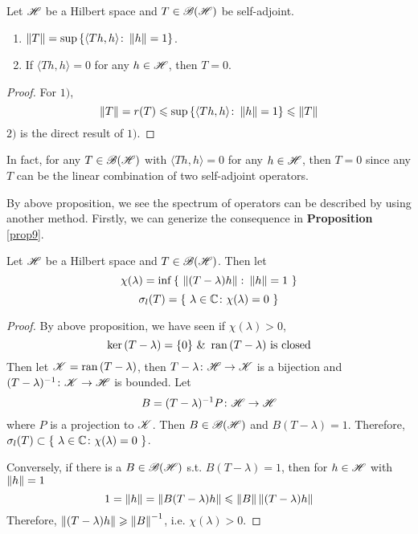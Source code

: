 \documentclass[a4paper,11pt]{report}
\begin{document}
\begin{cor} \label{cor8}
	Let $\mathscr{H}$ be a Hilbert space and $T \in \mathscr{B(H)}$ be self-adjoint.
	\begin{enumerate}[label=\arabic*)]
		\item $\left\lVert T\right\lVert = \sup{\{\langle Th,h \rangle \colon \left\lVert h\right\lVert = 1\}}$.
		\item If $\langle Th,h \rangle = 0$ for any $h \in \mathscr{H}$, then $T=0$.
	\end{enumerate}
\end{cor}
\begin{proof}
	For $1)$, 
	\begin{equation*}
		\left\lVert T\right\lVert = r(T) \leqslant \sup{\{\langle Th,h \rangle \colon \left\lVert h\right\lVert = 1\}} \leqslant \left\lVert T\right\lVert
	\end{equation*}
	$2)$ is the direct result of $1)$.
\end{proof}
\begin{rem}
	In fact, for any $T \in \mathscr{B(H)}$ with $\langle Th,h \rangle = 0$ for any $h \in \mathscr{H}$, then $T = 0$ since any $T$ can be the linear combination of two self-adjoint operators.
\end{rem}

By above proposition, we see the spectrum of operators can be described by using another method. Firstly, we can generize the consequence in \textbf{Proposition} \ref{prop9}.
\begin{prop}
	Let $\mathscr{H}$ be a Hilbert space and $T \in \mathscr{B(H)}$. Then let 
	\begin{equation*}
		\chi(\lambda) = \inf{\{~\left\lVert(T-\lambda)h\right\lVert \colon \left\lVert h\right\lVert = 1~\}}
	\end{equation*}
	\begin{equation*}
		\sigma_l(T) =\{~\lambda \in \mathbb{C} \colon \chi(\lambda) = 0~\}
	\end{equation*}
\end{prop}
\begin{proof}
	By above proposition, we have seen if $\chi(\lambda) > 0$, 
	\begin{equation*}
		\ker{(T - \lambda)}=\{0\} ~\&~ \operatorname{ran}{(T - \lambda)} \text{ is closed}
	\end{equation*}
	Then let $\mathscr{K} = \operatorname{ran}{(T - \lambda)}$, then $T - \lambda \colon \mathscr{H} \rightarrow \mathscr{K}$ is a bijection and\\ $(T-\lambda)^{-1} \colon \mathscr{K} \rightarrow \mathscr{H}$ is bounded. Let
	\begin{equation*}
		B = (T-\lambda)^{-1}P \colon \mathscr{H} \rightarrow \mathscr{H}
	\end{equation*}
	where $P$ is a projection to $\mathscr{K}$. Then $B \in \mathscr{B(H)}$ and $B(T - \lambda) = 1$. Therefore, $\sigma_l(T) \subset \{~\lambda \in \mathbb{C} \colon \chi(\lambda) = 0~\}$.
	\item Conversely, if there is a $B \in \mathscr{B(H)}$ s.t. $B(T-\lambda)=1$, then
	for $h \in \mathscr{H}$ with $\left\lVert h\right\lVert = 1$
	\begin{equation*}
		1 = \left\lVert h\right\lVert = \left\lVert B(T-\lambda)h\right\lVert \leqslant \left\lVert B\right\lVert\left\lVert(T-\lambda)h\right\lVert
	\end{equation*}
	Therefore, $\left\lVert(T-\lambda)h\right\lVert \geqslant \left\lVert B\right\lVert^{-1}$, i.e. $\chi(\lambda) > 0$.
\end{proof}
\end{document}
